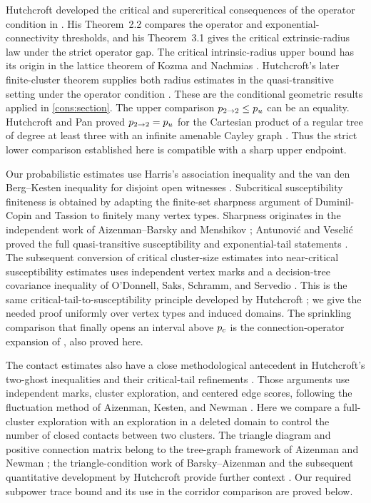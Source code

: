 Hutchcroft developed the critical and supercritical consequences of
the operator condition in \cite{Hutchcroft2020L2}. His
Theorem~2.2 compares the operator and exponential-connectivity
thresholds, and his Theorem~3.1 gives the critical extrinsic-radius
law under the strict operator gap. The critical intrinsic-radius
upper bound has its origin in the lattice theorem of Kozma and
Nachmias \cite[Theorem~1.2(ii)]{KozmaNachmias2009}.
Hutchcroft's later finite-cluster theorem supplies both radius
estimates in the quasi-transitive setting under the operator
condition \cite[Theorem~1.2]{Hutchcroft2022FiniteClusters}.
These are the conditional geometric results applied in
\cref{cons:section}.
The upper comparison ${p_{2\to2}}\le{p_u}$ can be an equality.
Hutchcroft and Pan proved ${p_{2\to2}}={p_u}$ for the Cartesian
product of a regular tree of degree at least three with an infinite
amenable Cayley graph
\cite[Theorem~1.2]{HutchcroftPan2024Dimension}. Thus the strict lower
comparison established here is compatible with a sharp upper endpoint.

Our probabilistic estimates use Harris's association inequality and
the van den Berg--Kesten inequality for disjoint open witnesses
\cite{Harris1960,VanDenBergKesten1985}. Subcritical susceptibility
finiteness is obtained by adapting the finite-set sharpness argument
of Duminil-Copin and Tassion \cite[Section~1]{DuminilCopinTassion2016}
to finitely many vertex types. Sharpness originates in the independent
work of Aizenman--Barsky and Menshikov
\cite{AizenmanBarsky1987,Menshikov1986}; Antunovi\'c and Veseli\'c
proved the full quasi-transitive susceptibility and exponential-tail
statements \cite{AntunovicVeselic2008}. The subsequent conversion of critical
cluster-size estimates into near-critical susceptibility estimates
uses independent vertex marks and a decision-tree covariance
inequality of O'Donnell, Saks, Schramm, and Servedio
\cite[Section~3.3, Equation~(6)]{ODonnellSaksSchrammServedio2005}.
This is the same critical-tail-to-susceptibility principle developed
by Hutchcroft \cite[Theorem~1.1]{Hutchcroft2020Exponents}; we give
the needed proof uniformly over vertex types and induced domains.
The sprinkling comparison that finally opens an interval above
${p_c}$ is the connection-operator expansion of
\cite[Lemma~2.4]{Hutchcroft2019}, also proved here.

The contact estimates also have a close methodological antecedent in
Hutchcroft's two-ghost inequalities and their critical-tail refinements
\cite{Hutchcroft2020Locality,Hutchcroft2021PowerLaw}. Those arguments
use independent marks, cluster exploration, and centered edge scores,
following the fluctuation method of Aizenman, Kesten, and Newman
\cite{AizenmanKestenNewman1987}. Here we compare a full-cluster
exploration with an exploration in a deleted domain to control the
number of closed contacts between two clusters. The triangle diagram
and positive connection matrix belong to the tree-graph framework of
Aizenman and Newman \cite{AizenmanNewman1984}; the triangle-condition
work of Barsky--Aizenman and the subsequent quantitative development
by Hutchcroft provide further context
\cite{BarskyAizenman1991,Hutchcroft2022Triangle}. Our required subpower
trace bound and its use in the corridor comparison are proved below.

